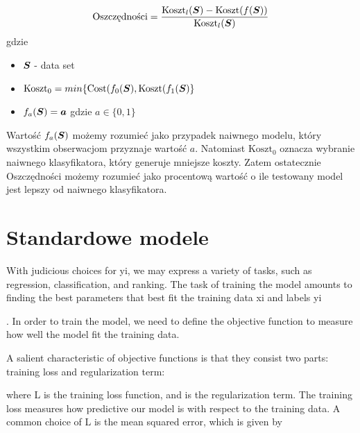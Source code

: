 \documentclass{book}
\begin{document}
	\begin{equation}
		\text{Oszczędności} = \frac{\text{Koszt}_{l}(\boldsymbol{S}) - \text{Koszt}(f(\boldsymbol{S}))}{\text{Koszt}_{l}(\boldsymbol{S})}
	\end{equation}
	gdzie
	\begin{itemize}
		\item $ \boldsymbol{S} $ - data set
		\item $ \text{Koszt}_0 = min\{\text{Cost}(f_{0}(\boldsymbol{S}), \text{Koszt}(f_{1}(\boldsymbol{S})\} $
		\item $ f_{a}(\boldsymbol{S}) = \boldsymbol{a} $ gdzie $a \in \{0,1\}$
	\end{itemize}{}
	Wartość $ f_{a}(\boldsymbol{S})$ możemy rozumieć jako przypadek naiwnego modelu, który wszystkim obserwacjom przyznaje wartość $a$. Natomiast $ \text{Koszt}_0 $ oznacza wybranie naiwnego klasyfikatora, który generuje mniejsze koszty. Zatem ostatecznie Oszczędności możemy rozumieć jako procentową wartość o ile testowany model jest lepszy od naiwnego klasyfikatora.
	

\section{Standardowe modele}

	
	With judicious choices for yi, we may express a variety of tasks, such as regression, classification, and ranking. The task of training the model amounts to finding the best parameters that best fit the training data xi and labels yi
	
	. In order to train the model, we need to define the objective function to measure how well the model fit the training data.
	
	A salient characteristic of objective functions is that they consist two parts: training loss and regularization term:

	
	where L
	is the training loss function, and is the regularization term. The training loss measures how predictive our model is with respect to the training data. A common choice of L is the mean squared error, which is given by
\end{document}
